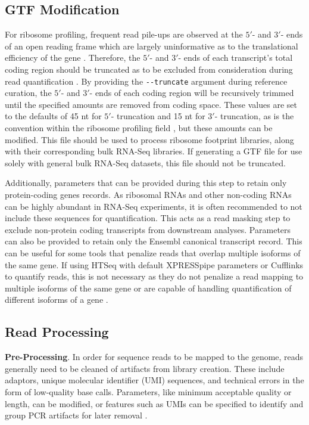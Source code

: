 \documentclass[10pt, oneside]{article}
\begin{document}
\subsection*{GTF Modification}
For ribosome profiling, frequent read pile-ups are observed at the $5'$- and $3'$- ends of an open reading frame which are largely uninformative as to the translational efficiency of the gene \cite{gerashchenko_nar}. Therefore, the $5'$- and $3'$- ends of each transcript's total coding region should be truncated as to be excluded from consideration during read quantification \cite{ingolia_meth, weinberg_reports}. By providing the \texttt{-{}-truncate} argument during reference curation, the $5'$- and $3'$- ends of each coding region will be recursively trimmed until the specified amounts are removed from coding space. These values are set to the defaults of 45 nt for $5'$- truncation and 15 nt for $3'$- truncation, as is the convention within the ribosome profiling field \cite{ingolia_meth}, but these amounts can be modified. This file should be used to process ribosome footprint libraries, along with their corresponding bulk RNA-Seq libraries. If generating a GTF file for use solely with general bulk RNA-Seq datasets, this file should not be truncated. \par

Additionally, parameters that can be provided during this step to retain only protein-coding genes records. As ribosomal RNAs and other non-coding RNAs can be highly abundant in RNA-Seq experiments, it is often recommended to not include these sequences for quantification. This acts as a read masking step to exclude non-protein coding transcripts from downstream analyses. Parameters can also be provided to retain only the Ensembl canonical transcript record. This can be useful for some tools that penalize reads that overlap multiple isoforms of the same gene. If using HTSeq with default XPRESSpipe parameters or Cufflinks to quantify reads, this is not necessary as they do not penalize a read mapping to multiple isoforms of the same gene or are capable of handling quantification of different isoforms of a gene \cite{htseq, cufflinks}.\\

\subsection*{Read Processing}
\textbf{Pre-Processing}. In order for sequence reads to be mapped to the genome, reads generally need to be cleaned of artifacts from library creation. These include adaptors, unique molecular identifier (UMI) sequences, and technical errors in the form of low-quality base calls. Parameters, like minimum acceptable quality or length, can be modified, or features such as UMIs can be specified to identify and group PCR artifacts for later removal \cite{umi, umitools}. \par
\end{document}
